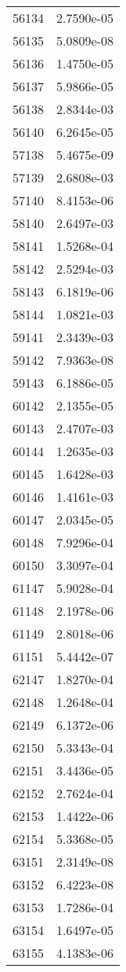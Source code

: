 \begin{table}[h!]
\begin{tabular}{|| c || c |}
56134 & 2.7590e-05 \\
56135 & 5.0809e-08 \\
56136 & 1.4750e-05 \\
56137 & 5.9866e-05 \\
56138 & 2.8344e-03 \\
56140 & 6.2645e-05 \\
57138 & 5.4675e-09 \\
57139 & 2.6808e-03 \\
57140 & 8.4153e-06 \\
58140 & 2.6497e-03 \\
58141 & 1.5268e-04 \\
58142 & 2.5294e-03 \\
58143 & 6.1819e-06 \\
58144 & 1.0821e-03 \\
59141 & 2.3439e-03 \\
59142 & 7.9363e-08 \\
59143 & 6.1886e-05 \\
60142 & 2.1355e-05 \\
60143 & 2.4707e-03 \\
60144 & 1.2635e-03 \\
60145 & 1.6428e-03 \\
60146 & 1.4161e-03 \\
60147 & 2.0345e-05 \\
60148 & 7.9296e-04 \\
60150 & 3.3097e-04 \\
61147 & 5.9028e-04 \\
61148 & 2.1978e-06 \\
61149 & 2.8018e-06 \\
61151 & 5.4442e-07 \\
62147 & 1.8270e-04 \\
62148 & 1.2648e-04 \\
62149 & 6.1372e-06 \\
62150 & 5.3343e-04 \\
62151 & 3.4436e-05 \\
62152 & 2.7624e-04 \\
62153 & 1.4422e-06 \\
62154 & 5.3368e-05 \\
63151 & 2.3149e-08 \\
63152 & 6.4223e-08 \\
63153 & 1.7286e-04 \\
63154 & 1.6497e-05 \\
63155 & 4.1383e-06 \\

\end{tabular}
\end{table}
